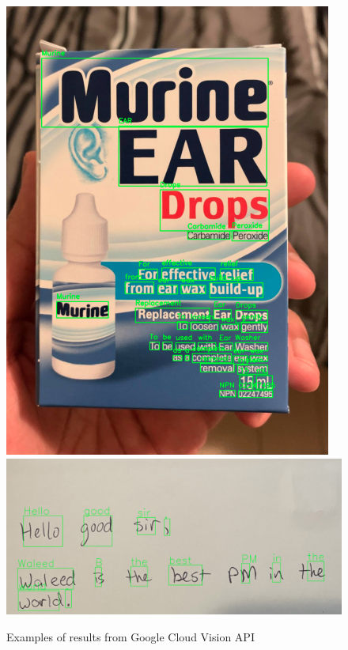 \documentclass[a4paper,11pt]{article}
\begin{document}
\begin{figure}[H]
\centering
\includegraphics[scale=0.5]{img/cv/ocr_text_in_the_wild.png}
\includegraphics[scale=0.5]{img/cv/ocr_handwriting.png}
\caption{Examples of results from Google Cloud Vision API}
\label{fig:google_vision_examples}
\end{figure}
\end{document}
